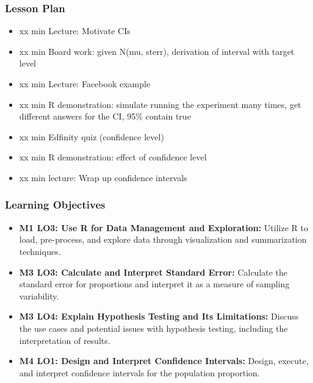 

\begin{frame}
\frametitle{Lesson Plan}
\begin{itemize}
    \item xx min Lecture: Motivate CIs
    \item xx min Board work: given N(mu, sterr), derivation of interval with target level
    \item xx min Lecture: Facebook example
    \item xx min R demonstration: simulate running the experiment many times, get different answers for the CI, 95\% contain true
    \item xx min Edfinity quiz (confidence level)
    \item xx min R demonstration: effect of confidence level
    \item xx min lecture: Wrap up confidence intervals
\end{itemize}
\end{frame}
        
\begin{frame}
\frametitle{Learning Objectives}
\begin{itemize}
    \item \textbf{M1 LO3: Use R for Data Management and Exploration:} Utilize R to load, pre-process, and explore data through visualization and summarization techniques.
    \item \textbf{M3 LO3: Calculate and Interpret Standard Error:} Calculate the standard error for proportions and interpret it as a measure of sampling variability. 
    \item \textbf{M3 LO4: Explain Hypothesis Testing and Its Limitations:} Discuss the use cases and potential issues with hypothesis testing, including the interpretation of results. 
    \item \textbf{M4 LO1: Design and Interpret Confidence Intervals:} Design, execute, and interpret confidence intervals for the population proportion. 
\end{itemize}
\end{frame}

